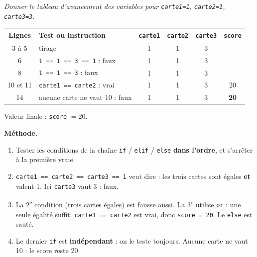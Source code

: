 \documentclass[addpoints, 11pt]{exam}
\newcommand{\enonce}[1]{\textit{#1}\par\smallskip}
\newcommand{\methode}{\par\smallskip\noindent\textbf{Méthode.}\ }
\newcommand{\code}[1]{\texttt{#1}}
\DeclareRobustCommand{\_}{\textunderscore\allowbreak}
\begin{document}
\begin{questions}
\question[3] \enonce{Donner le tableau d'avancement des variables pour \code{carte1=1}, \code{carte2=1}, \code{carte3=3}.}
\begin{reponse}
\begin{center}
\begin{tabular}{|c|l|c|c|c|c|}
\hline
Lignes & Test ou instruction & \code{carte1} & \code{carte2} & \code{carte3} & \code{score} \\ \hline
3 à 5 & tirage & 1 & 1 & 3 & \\
6 & \code{1 == 1 == 3 == 1} : faux & 1 & 1 & 3 & \\
8 & \code{1 == 1 == 3} : faux & 1 & 1 & 3 & \\
10 et 11 & \code{carte1 == carte2} : vrai & 1 & 1 & 3 & 20 \\
14 & aucune carte ne vaut 10 : faux & 1 & 1 & 3 & \textbf{20} \\ \hline
\end{tabular}
\end{center}
Valeur finale : \code{score} $= 20$.
\end{reponse}
\methode
\begin{enumerate}
  \item Tester les conditions de la chaîne \code{if} / \code{elif} / \code{else} \textbf{dans l'ordre}, et s'arrêter à la première vraie.
  \item \code{carte1 == carte2 == carte3 == 1} veut dire : les trois cartes sont égales \textbf{et} valent 1. Ici \code{carte3} vaut 3 : faux.
  \item La 2\textsuperscript{e} condition (trois cartes égales) est fausse aussi. La 3\textsuperscript{e} utilise \code{or} : une seule égalité suffit. \code{carte1 == carte2} est vrai, donc \code{score = 20}. Le \code{else} est sauté.
  \item Le dernier \code{if} est \textbf{indépendant} : on le teste toujours. Aucune carte ne vaut 10 : le score reste 20.
\end{enumerate}


\end{questions}
\end{document}
